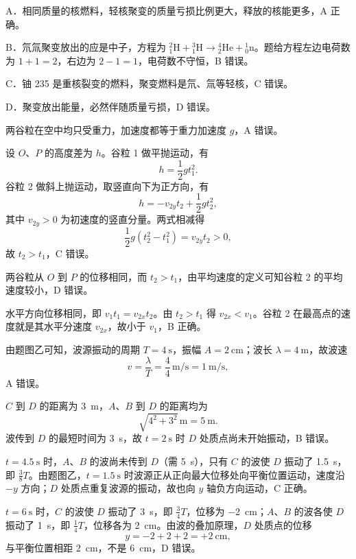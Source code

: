 
\begin{answer}
A．相同质量的核燃料，轻核聚变的质量亏损比例更大，释放的核能更多，A 正确。

B．氘氚聚变放出的应是中子，方程为 ${}_{1}^{2}\mathrm{H}+{}_{1}^{3}\mathrm{H}\to{}_{2}^{4}\mathrm{He}+{}_{0}^{1}\mathrm{n}$。题给方程左边电荷数为 $1+1=2$，右边为 $2-1=1$，电荷数不守恒，B 错误。

C．铀 235 是重核裂变的燃料，聚变燃料是氘、氚等轻核，C 错误。

D．聚变放出能量，必然伴随质量亏损，D 错误。
\end{answer}

\begin{answer}
两谷粒在空中均只受重力，加速度都等于重力加速度 $g$，A 错误。

设 $O$、$P$ 的高度差为 $h$。谷粒 1 做平抛运动，有
\[
  h=\frac{1}{2}gt_{1}^{2}.
\]
谷粒 2 做斜上抛运动，取竖直向下为正方向，有
\[
  h=-v_{2y}t_{2}+\frac{1}{2}gt_{2}^{2},
\]
其中 $v_{2y}>0$ 为初速度的竖直分量。两式相减得
\[
  \frac{1}{2}g\left(t_{2}^{2}-t_{1}^{2}\right)=v_{2y}t_{2}>0,
\]
故 $t_{2}>t_{1}$，C 错误。

两谷粒从 $O$ 到 $P$ 的位移相同，而 $t_{2}>t_{1}$，由平均速度的定义可知谷粒 2 的平均速度较小，D 错误。

水平方向位移相同，即 $v_{1}t_{1}=v_{2x}t_{2}$。由 $t_{2}>t_{1}$ 得 $v_{2x}<v_{1}$。谷粒 2 在最高点的速度就是其水平分速度 $v_{2x}$，故小于 $v_{1}$，B 正确。
\end{answer}

\begin{answer}
由题图乙可知，波源振动的周期 $T=\SI{4}{\second}$，振幅 $A=\SI{2}{\centi\metre}$；波长 $\lambda=\SI{4}{\metre}$，故波速
\[
  v=\frac{\lambda}{T}=\frac{4}{4}\,\si{\metre\per\second}=\SI{1}{\metre\per\second},
\]
A 错误。

$C$ 到 $D$ 的距离为 \SI{3}{\metre}，$A$、$B$ 到 $D$ 的距离均为
\[
  \sqrt{4^{2}+3^{2}}\,\si{\metre}=\SI{5}{\metre}.
\]
波传到 $D$ 的最短时间为 \SI{3}{\second}，故 $t=\SI{2}{\second}$ 时 $D$ 处质点尚未开始振动，B 错误。

$t=\SI{4.5}{\second}$ 时，$A$、$B$ 的波尚未传到 $D$（需 \SI{5}{\second}），只有 $C$ 的波使 $D$ 振动了 \SI{1.5}{\second}，即 $\tfrac{3}{8}T$。由题图乙，$t=\SI{1.5}{\second}$ 时波源正从正向最大位移处向平衡位置运动，速度沿 $-y$ 方向；$D$ 处质点重复波源的振动，故也向 $y$ 轴负方向运动，C 正确。

$t=\SI{6}{\second}$ 时，$C$ 的波使 $D$ 振动了 \SI{3}{\second}，即 $\tfrac{3}{4}T$，位移为 \SI{-2}{\centi\metre}；$A$、$B$ 的波各使 $D$ 振动了 \SI{1}{\second}，即 $\tfrac{1}{4}T$，位移各为 \SI{+2}{\centi\metre}。由波的叠加原理，$D$ 处质点的位移
\[
  y=-2+2+2=+\SI{2}{\centi\metre},
\]
与平衡位置相距 \SI{2}{\centi\metre}，不是 \SI{6}{\centi\metre}，D 错误。
\end{answer}

